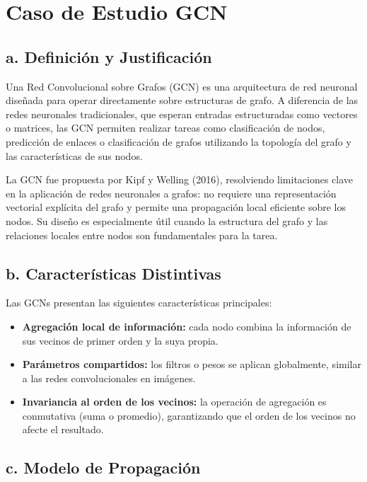 \documentclass[11pt]{article} %
\begin{document}
\newpage 
{\section*{Caso de Estudio GCN}} \vspace{10pt}


\subsection*{a. Definición y Justificación}

Una Red Convolucional sobre Grafos (GCN) es una arquitectura de red neuronal diseñada para operar directamente sobre estructuras de grafo. A diferencia de las redes neuronales tradicionales, que esperan entradas estructuradas como vectores o matrices, las GCN permiten realizar tareas como clasificación de nodos, predicción de enlaces o clasificación de grafos utilizando la topología del grafo y las características de sus nodos.

La GCN fue propuesta por Kipf y Welling (2016), resolviendo limitaciones clave en la aplicación de redes neuronales a grafos: no requiere una representación vectorial explícita del grafo y permite una propagación local eficiente sobre los nodos. Su diseño es especialmente útil cuando la estructura del grafo y las relaciones locales entre nodos son fundamentales para la tarea.

\subsection*{b. Características Distintivas}

Las GCNs presentan las siguientes características principales:

\begin{itemize}
    \item \textbf{Agregación local de información:} cada nodo combina la información de sus vecinos de primer orden y la suya propia.
    \item \textbf{Parámetros compartidos:} los filtros o pesos se aplican globalmente, similar a las redes convolucionales en imágenes.
    \item \textbf{Invariancia al orden de los vecinos:} la operación de agregación es conmutativa (suma o promedio), garantizando que el orden de los vecinos no afecte el resultado.
\end{itemize}


\subsection*{c. Modelo de Propagación}
\end{document}
